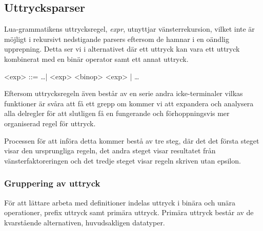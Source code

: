 \subsection{Uttrycksparser}

Lua-grammatikens uttrycksregel, \textit{expr}, utnyttjar vänsterrekursion,
vilket inte är möjligt i rekursivt nedstigande parsers eftersom de hamnar i en
oändlig upprepning. Detta ser vi i alternativet där ett uttryck kan vara ett uttryck
kombinerat med en binär operator samt ett annat uttryck.


\setlength{\grammarindent}{5em}
\begin{grammar}
  \singlespace\small%
  \selectfont
  <exp> ::= \ldots | <exp> <binop> <exp> | \ldots
\end{grammar}

Eftersom uttrycksregeln även består av en serie andra icke-terminaler vilkas
funktioner är svåra att få ett grepp om kommer vi att expandera och analysera
alla delregler för att slutligen få en fungerande och förhoppningsvis mer
organiserad regel för uttryck.

Processen för att införa detta kommer bestå av tre steg, där det det första
steget visar den ursprungliga regeln, det andra steget visar resultatet från
vänsterfaktoreringen och det tredje steget visar regeln skriven utan epsilon.


\subsubsection{Gruppering av uttryck}

För att lättare arbeta med definitioner indelas uttryck i binära och unära
operationer, prefix uttryck samt primära uttryck. Primära uttryck består av de
kvarstående alternativen, huvudsakligen datatyper.


